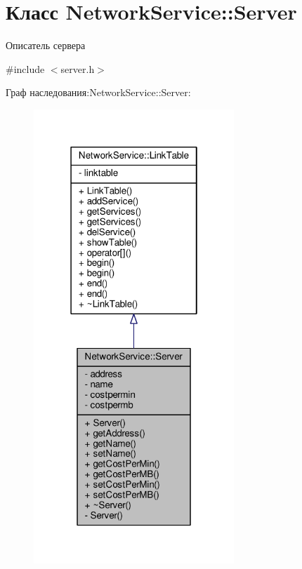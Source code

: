 \hypertarget{class_network_service_1_1_server}{}\section{Класс Network\+Service\+:\+:Server}
\label{class_network_service_1_1_server}


Описатель сервера  




{\ttfamily \#include $<$server.\+h$>$}



Граф наследования\+:Network\+Service\+:\+:Server\+:
\nopagebreak
\begin{figure}[H]
\begin{center}
\leavevmode
\includegraphics[width=214pt]{class_network_service_1_1_server__inherit__graph}
\end{center}
\end{figure}


